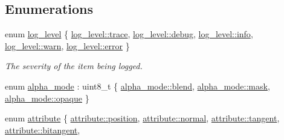 \subsection*{Enumerations}
\begin{DoxyCompactItemize}
\item 
enum \mbox{\hyperlink{namespacemoka_a7c4111664aee7737c54ab37376b2637d}{log\+\_\+level}} \{ \newline
\mbox{\hyperlink{namespacemoka_a7c4111664aee7737c54ab37376b2637da04a75036e9d520bb983c5ed03b8d0182}{log\+\_\+level\+::trace}}, 
\mbox{\hyperlink{namespacemoka_a7c4111664aee7737c54ab37376b2637daad42f6697b035b7580e4fef93be20b4d}{log\+\_\+level\+::debug}}, 
\mbox{\hyperlink{namespacemoka_a7c4111664aee7737c54ab37376b2637dacaf9b6b99962bf5c2264824231d7a40c}{log\+\_\+level\+::info}}, 
\mbox{\hyperlink{namespacemoka_a7c4111664aee7737c54ab37376b2637da1ea4c3ab05ee0c6d4de30740443769cb}{log\+\_\+level\+::warn}}, 
\newline
\mbox{\hyperlink{namespacemoka_a7c4111664aee7737c54ab37376b2637dacb5e100e5a9a3e7f6d1fd97512215282}{log\+\_\+level\+::error}}
 \}
\begin{DoxyCompactList}\small\item\em The severity of the item being logged. \end{DoxyCompactList}\item 
enum \mbox{\hyperlink{namespacemoka_ad3e7f1428e786c2e7780186b8c0b0d81}{alpha\+\_\+mode}} \+: uint8\+\_\+t \{ \mbox{\hyperlink{namespacemoka_ad3e7f1428e786c2e7780186b8c0b0d81ac195f144a8d768f2bb87f155ed2117a4}{alpha\+\_\+mode\+::blend}}, 
\mbox{\hyperlink{namespacemoka_ad3e7f1428e786c2e7780186b8c0b0d81af2ce11ebf110993621bedd8e747d7b1b}{alpha\+\_\+mode\+::mask}}, 
\mbox{\hyperlink{namespacemoka_ad3e7f1428e786c2e7780186b8c0b0d81a94619f8a70068b2591c2eed622525b0e}{alpha\+\_\+mode\+::opaque}}
 \}
\item 
enum \mbox{\hyperlink{namespacemoka_a16a7bd7fc66f698dfcaf9bca1312a2bb}{attribute}} \{ \newline
\mbox{\hyperlink{namespacemoka_a16a7bd7fc66f698dfcaf9bca1312a2bba4757fe07fd492a8be0ea6a760d683d6e}{attribute\+::position}}, 
\mbox{\hyperlink{namespacemoka_a16a7bd7fc66f698dfcaf9bca1312a2bbafea087517c26fadd409bd4b9dc642555}{attribute\+::normal}}, 
\mbox{\hyperlink{namespacemoka_a16a7bd7fc66f698dfcaf9bca1312a2bba75e7384f08d8f81a380699ce840c1167}{attribute\+::tangent}}, 
\mbox{\hyperlink{namespacemoka_a16a7bd7fc66f698dfcaf9bca1312a2bba7d801ec4cb945343f19cff044dbfadba}{attribute\+::bitangent}}, 
\newline

\end{DoxyCompactItemize}
